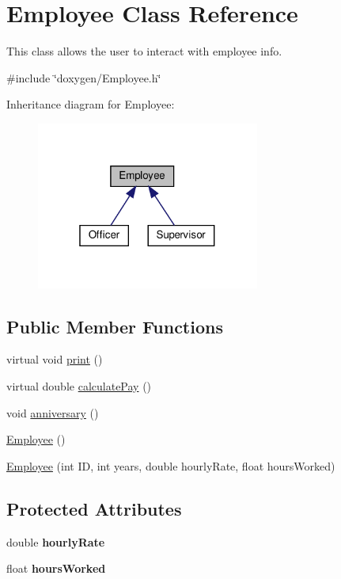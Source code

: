 \hypertarget{classEmployee}{}\section{Employee Class Reference}
\label{classEmployee}


This class allows the user to interact with employee info.  




{\ttfamily \#include \char`\"{}doxygen/\+Employee.\+h\char`\"{}}



Inheritance diagram for Employee\+:
\nopagebreak
\begin{figure}[H]
\begin{center}
\leavevmode
\includegraphics[width=208pt]{classEmployee__inherit__graph}
\end{center}
\end{figure}
\subsection*{Public Member Functions}
\begin{DoxyCompactItemize}
\item 
virtual void \hyperlink{classEmployee_a79556ad700627dba88049f487a34a762}{print} ()
\item 
virtual double \hyperlink{classEmployee_a01c2c44e15434237db28832f6972e960}{calculate\+Pay} ()
\item 
void \hyperlink{classEmployee_a67c345031cf63f515fb09dc675dee5f3}{anniversary} ()
\item 
\hyperlink{classEmployee_a003c7bd08c40924e381eb0750cbb906f}{Employee} ()
\item 
\hyperlink{classEmployee_ad0c935ef9a290a82dcf7865172c90148}{Employee} (int ID, int years, double hourly\+Rate, float hours\+Worked)
\end{DoxyCompactItemize}
\subsection*{Protected Attributes}
\begin{DoxyCompactItemize}
\item 
\mbox{\label{classEmployee_ac31134abb9b4004fc015e51ef579b069}} 
double {\bfseries hourly\+Rate}
\item 
\mbox{\label{classEmployee_afde35c73d02eb1cfe89e23a80998b42e}} 
float {\bfseries hours\+Worked}
\end{DoxyCompactItemize}
